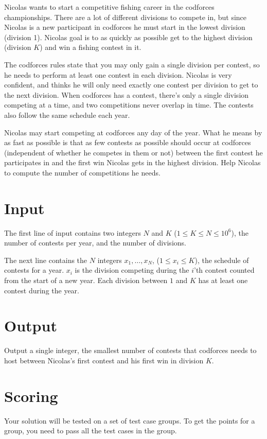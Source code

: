 \def\version{jury-2}
Nicolas wants to start a competitive fishing career in the codforces\texttrademark{} championships.
There are a lot of different divisions to compete in, but since Nicolas is a new participant in codforces\texttrademark{} he must start in the lowest division (division 1).
Nicolas goal is to as quickly as possible get to the highest division (division $K$) and win a fishing contest in it.

The codforces\texttrademark{} rules state that you may only gain a single division per contest, so he needs to perform at least one contest in each division.
Nicolas is very confident, and thinks he will only need exactly one contest per division to get to the next division.
When codforces\texttrademark{} has a contest, there's only a single division competing at a time, and two competitions never overlap in time.
The contests also follow the same schedule each year.

Nicolas may start competing at codforces\texttrademark{} any day of the year.
What he means by as fast as possible is that as few contests as possible should occur at codforces\texttrademark{} (independent of whether he competes in them or not) between the first contest he participates in and the first win Nicolas gets in the highest division.
Help Nicolas to compute the number of competitions he needs.

\section*{Input}
The first line of input contains two integers $N$ and $K$ ($1 \leq K \leq N \leq 10^6$), the number of contests per year, and the number of divisions.

The next line contains the $N$ integers $x_1, \dots, x_N$, ($1 \leq x_i \leq K$), the schedule of contests for a year.
$x_i$ is the division competing during the $i$'th contest counted from the start of a new year.
Each division between $1$ and $K$ has at least one contest during the year.

\section*{Output}
Output a single integer, the smallest number of contests that codforces\texttrademark{} needs to host between Nicolas's first contest and his first win in division $K$.

\section*{Scoring}
Your solution will be tested on a set of test case groups.
To get the points for a group, you need to pass all the test cases in the group.

